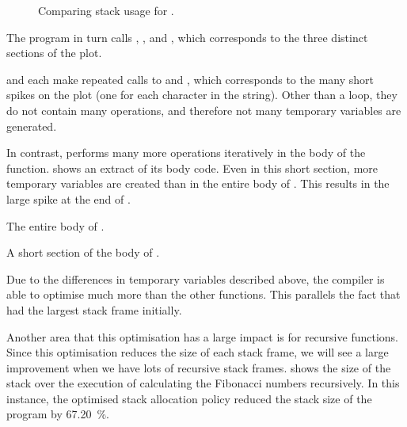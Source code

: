 \documentclass[00-main.tex]{subfiles}
\begin{document}
\begin{figure}[ht]
  \centering
  \caption{Comparing stack usage for .}
  \label{fig:comparing stack usage for case.c}
\end{figure}

The program in turn calls , , and , which corresponds to the three distinct sections of the plot.

 and  each make repeated calls to  and , which corresponds to the many short spikes on the plot (one for each character in the string).
Other than a  loop, they do not contain many operations, and therefore not many temporary variables are generated.


In contrast,  performs many more operations iteratively in the body of the function.
 shows an extract of its body code.
Even in this short section, more temporary variables are created than in the entire body of .
This results in the large spike at the end of .

\begin{listing}[!ht]
  \caption{The entire body of .}
  \label{lst:caseupper body code}
\end{listing}

\begin{listing}[!ht]
  \caption{A short section of the body of .}
  \label{lst:section of casecamel body code}
\end{listing}

Due to the differences in temporary variables described above, the compiler is able to optimise  much more than the other functions.
This parallels the fact that  had the largest stack frame initially.


Another area that this optimisation has a large impact is for recursive functions.
Since this optimisation reduces the size of each stack frame, we will see a large improvement when we have lots of recursive stack frames.
 shows the size of the stack over the execution of calculating the Fibonacci numbers recursively.
In this instance, the optimised stack allocation policy reduced the stack size of the program by \SI{67.20}{\percent}.
\end{document}
